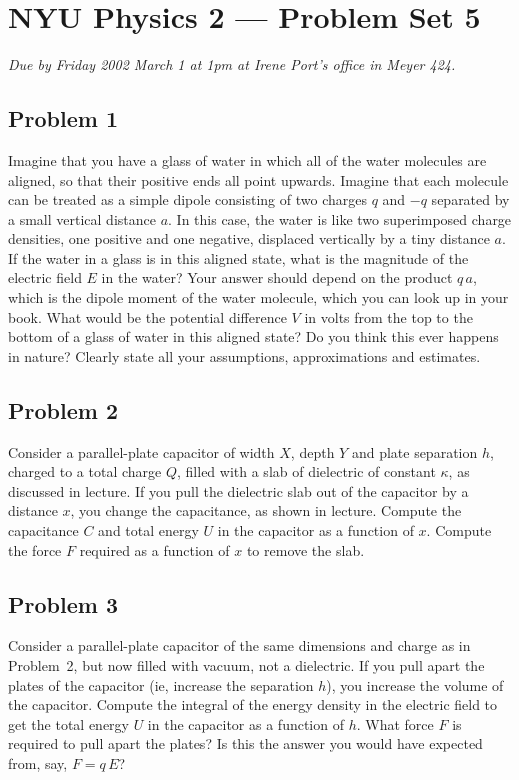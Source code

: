 \documentclass{article}
\begin{document}
\thispagestyle{empty}
\section*{NYU Physics 2 --- Problem Set 5}

\emph{Due by Friday 2002 March 1 at 1pm at Irene Port's office in
Meyer 424.}

\subsection*{Problem 1}

Imagine that you have a glass of water in which all of the water
molecules are aligned, so that their positive ends all point upwards.
Imagine that each molecule can be treated as a simple dipole
consisting of two charges $q$ and $-q$ separated by a small vertical
distance $a$.  In this case, the water is like two superimposed charge
densities, one positive and one negative, displaced vertically by a
tiny distance $a$.  If the water in a glass is in this aligned state,
what is the magnitude of the electric field $E$ in the water?  Your
answer should depend on the product $q\,a$, which is the dipole moment
of the water molecule, which you can look up in your book.  What would
be the potential difference $V$ in volts from the top to the bottom of
a glass of water in this aligned state?  Do you think this ever
happens in nature?  Clearly state all your assumptions, approximations
and estimates.

\subsection*{Problem 2}

Consider a parallel-plate capacitor of width $X$, depth $Y$ and plate
separation $h$, charged to a total charge $Q$, filled with a slab of
dielectric of constant $\kappa$, as discussed in lecture.  If you pull
the dielectric slab out of the capacitor by a distance $x$, you change
the capacitance, as shown in lecture.  Compute the capacitance $C$ and
total energy $U$ in the capacitor as a function of $x$.  Compute the
force $F$ required as a function of $x$ to remove the slab.

\subsection*{Problem 3}

Consider a parallel-plate capacitor of the same dimensions and charge
as in Problem~2, but now filled with vacuum, not a dielectric.  If you
pull apart the plates of the capacitor (ie, increase the separation
$h$), you increase the volume of the capacitor.  Compute the integral
of the energy density in the electric field to get the total energy
$U$ in the capacitor as a function of $h$.  What force $F$ is required
to pull apart the plates?  Is this the answer you would have expected
from, say, $F=q\,E$?
\end{document}
